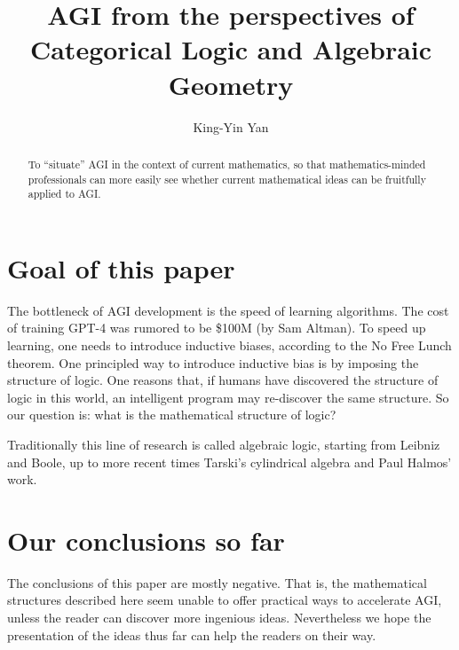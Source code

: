 \documentclass[runningheads]{llncs}
\begin{document}
%
\title{AGI from the perspectives of Categorical Logic and Algebraic Geometry}
%
%
\author{King-Yin Yan }
%
%
%
\maketitle              %
%
\begin{abstract}
To ``situate'' AGI in the context of current mathematics, so that mathematics-minded professionals can more easily see whether current mathematical ideas can be fruitfully applied to AGI.

\end{abstract}
%
%
%
\section{Goal of this paper}

The bottleneck of AGI development is the speed of learning algorithms.  The cost of training GPT-4 was rumored to be \$100M (by Sam Altman).  To speed up learning, one needs to introduce inductive biases, according to the No Free Lunch theorem.  One principled way to introduce inductive bias is by imposing the structure of logic.  One reasons that, if humans have discovered the structure of logic in this world, an intelligent program may re-discover the same structure.  So our question is:  what is the mathematical structure of logic?

Traditionally this line of research is called algebraic logic, starting from Leibniz and Boole, up to more recent times Tarski's cylindrical algebra and Paul Halmos' work.  

\section{Our conclusions so far}

The conclusions of this paper are mostly negative.  That is, the mathematical structures described here seem unable to offer practical ways to accelerate AGI, unless the reader can discover more ingenious ideas.  Nevertheless we hope the presentation of the ideas thus far can help the readers on their way.
\end{document}
